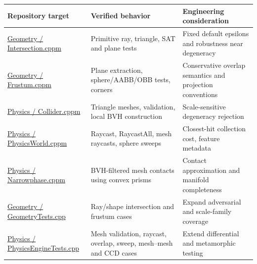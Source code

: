 {\def\LTcaptype{none} %
\begin{longtable}[]{@{}
  >{\raggedright\arraybackslash}p{}
  >{\raggedright\arraybackslash}p{}
  >{\raggedright\arraybackslash}p{}@{}}
\toprule\noalign{}
\begin{minipage}[b]{\linewidth}\raggedright
Repository target
\end{minipage} & \begin{minipage}[b]{\linewidth}\raggedright
Verified behavior
\end{minipage} & \begin{minipage}[b]{\linewidth}\raggedright
Engineering consideration
\end{minipage} \\
\midrule\noalign{}
\endhead
\bottomrule\noalign{}
\endlastfoot
\href{https://github.com/swayam8624/KairoGeometry/blob/master/Intersection.cppm?utm_source=chatgpt.com}{Geometry / Intersection.cppm} & Primitive ray, triangle, SAT and plane tests & Fixed default epsilons and robustness near degeneracy \\
\href{https://github.com/swayam8624/KairoGeometry/blob/master/Frustum.cppm?utm_source=chatgpt.com}{Geometry / Frustum.cppm} & Plane extraction, sphere/AABB/OBB tests, corners & Conservative overlap semantics and projection conventions \\
\href{https://github.com/swayam8624/KairoPhysicsEngine/blob/main/Collider.cppm?utm_source=chatgpt.com}{Physics / Collider.cppm} & Triangle meshes, validation, local BVH construction & Scale-sensitive degeneracy rejection \\
\href{https://github.com/swayam8624/KairoPhysicsEngine/blob/main/PhysicsWorld.cppm?utm_source=chatgpt.com}{Physics / PhysicsWorld.cppm} & Raycast, RaycastAll, mesh raycasts, sphere sweeps & Closest-hit collection cost, feature metadata \\
\href{https://github.com/swayam8624/KairoPhysicsEngine/blob/main/Narrowphase.cppm?utm_source=chatgpt.com}{Physics / Narrowphase.cppm} & BVH-filtered mesh contacts using convex prisms & Contact approximation and manifold completeness \\
\href{https://github.com/swayam8624/KairoGeometry/blob/master/tests/GeometryTests.cpp?utm_source=chatgpt.com}{Geometry / GeometryTests.cpp} & Ray/shape intersection and frustum cases & Expand adversarial and scale-family coverage \\
\href{https://github.com/swayam8624/KairoPhysicsEngine/blob/main/tests/PhysicsEngineTests.cpp?utm_source=chatgpt.com}{Physics / PhysicsEngineTests.cpp} & Mesh validation, raycast, overlap, sweep, mesh--mesh and CCD cases & Extend differential and metamorphic testing \\
\end{longtable}
}

